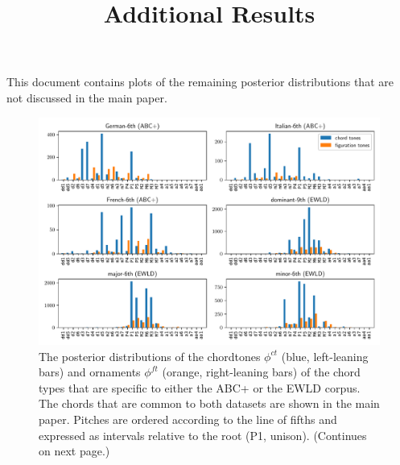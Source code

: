\documentclass[a4]{scrartcl}
\title{Additional Results}
\begin{document}
\maketitle

\noindent
This document contains plots of the remaining posterior distributions that are not discussed in the main paper.

\begin{figure}[h]
  \centering
  \includegraphics[width=\textwidth]{plots/chordtypes_rest1.pdf}
  \caption[The posterior distributions of the chordtones $\phi^{ct}$ and ornaments $\phi^\mathit{ft}$
    of the chord types that are specific to either the ABC+ or the EWLD corpus.]{
    The posterior distributions of the chordtones $\phi^{ct}$ (blue, left-leaning bars)
    and ornaments $\phi^\mathit{ft}$ (orange, right-leaning bars)
    of the chord types that are specific to either the ABC+ or the EWLD corpus.
    The chords that are common to both datasets are shown in the main paper.
    Pitches are ordered according to the line of fifths
    and expressed as intervals relative to the root (P1, unison).
    (Continues on next page.)
  }
  \label{fig:harmonies-ornaments.profiles-rest}
\end{figure}%
\end{document}
